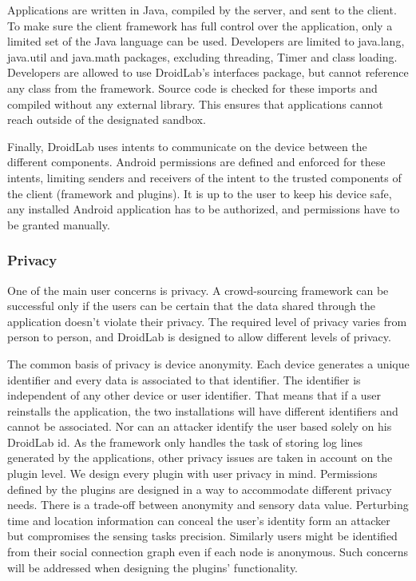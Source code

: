 \documentclass[conference,letterpaper]{IEEEtran}
\begin{document}
Applications are written in Java, compiled by the server, and sent to the client. To make sure the client framework has full control over the application, only a limited set of the Java language can be used. Developers are limited to java.lang, java.util and java.math packages, excluding threading, Timer and class loading. Developers are allowed to use DroidLab's interfaces package, but cannot reference any class from the framework. Source code is checked for these imports and compiled without any external library. This ensures that applications cannot reach outside of the designated sandbox.

Finally, DroidLab uses intents to communicate on the device between the different components. Android permissions are defined and enforced for these intents, limiting senders and receivers of the intent to the trusted components of the client (framework and plugins). It is up to the user to keep his device safe, any installed Android application has to be authorized, and permissions have to be granted manually.


\subsubsection{Privacy}

One of the main user concerns is privacy. A crowd-sourcing framework can be successful only if the users can be certain that the data shared through the application doesn't violate their privacy. The required level of privacy varies from person to person, and DroidLab is designed to allow different levels of privacy.

The common basis of privacy is device anonymity. Each device generates a unique identifier and every data is associated to that identifier. The identifier is independent of any other device or user identifier. That means that if a user reinstalls the application, the two installations will have different identifiers and cannot be associated. Nor can an attacker identify the user based solely on his DroidLab id. As the framework only handles the task of storing log lines generated by the applications, other privacy issues are taken in account on the plugin level. We design every plugin with user privacy in mind. Permissions defined by the plugins are designed in a way to accommodate different privacy needs. There is a trade-off between anonymity and sensory data value. Perturbing time and location information can conceal the user's identity form an attacker but compromises the sensing tasks precision. Similarly users might be identified from their social connection graph even if each node is anonymous. Such concerns will be addressed when designing the plugins' functionality.
\end{document}
